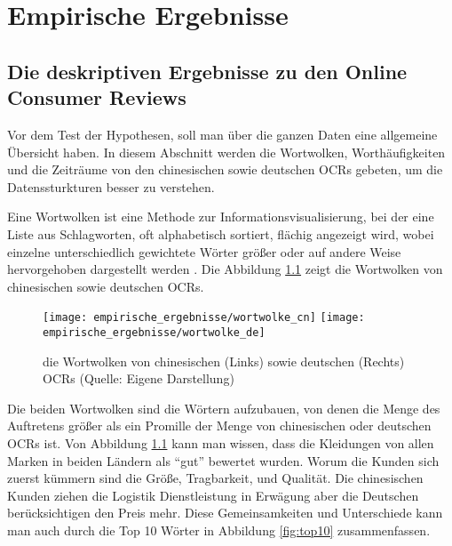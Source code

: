 \chapter{Empirische Ergebnisse} \label{Kapital4empirischeErgebnisse}
\section{Die deskriptiven Ergebnisse zu den Online Consumer Reviews}
Vor dem Test der Hypothesen, soll man über die ganzen Daten eine allgemeine Übersicht haben. In diesem Abschnitt werden die Wortwolken, Worthäufigkeiten und die Zeiträume von den chinesischen sowie deutschen \ac{OCRs} gebeten, um die Datenssturkturen besser zu verstehen. 

Eine Wortwolken ist eine Methode zur Informationsvisualisierung, bei der eine Liste aus Schlagworten, oft alphabetisch sortiert, flächig angezeigt wird, wobei einzelne unterschiedlich gewichtete Wörter größer oder auf andere Weise hervorgehoben dargestellt werden \citep{bateman2008seeing}. Die Abbildung \ref{fig:wortwolke} zeigt die Wortwolken von chinesischen sowie deutschen \ac{OCRs}.
\begin{figure}[h]
    \texttt{[image: empirische\_ergebnisse/wortwolke\_cn]}
    \endminipage\hfill
    \texttt{[image: empirische\_ergebnisse/wortwolke\_de]}
    \endminipage        
    \caption[die Wortwolken von chinesischen (Links) sowie deutschen (Rechts) OCRs]{die Wortwolken von chinesischen (Links) sowie deutschen (Rechts) \ac{OCRs} (Quelle: Eigene Darstellung)}
    \label{fig:wortwolke}
\end{figure}

Die beiden Wortwolken sind die Wörtern aufzubauen, von denen die Menge des Auftretens größer als ein Promille der Menge von chinesischen oder deutschen \ac{OCRs} ist. Von Abbildung \ref{fig:wortwolke} kann man wissen, dass die Kleidungen von allen Marken in beiden Ländern als ``gut'' bewertet wurden. Worum die Kunden sich zuerst kümmern sind die Größe, Tragbarkeit, und Qualität. Die chinesischen Kunden ziehen die Logistik Dienstleistung in Erwägung aber die Deutschen berücksichtigen den Preis mehr. Diese Gemeinsamkeiten und Unterschiede kann man auch durch die Top 10 Wörter in Abbildung \ref{fig:top10} zusammenfassen.

